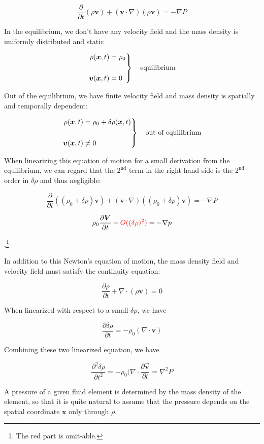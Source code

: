 ﻿\documentclass[twoside]{book}
\numberwithin{equation}{section}
\begin{document}
\[\frac{\partial}{\partial t}(\rho\bm{v})+(\bm{v}\cdot\nabla)(\rho\bm{v}) = -\nabla P \]

In the equilibrium, we don't have any velocity field and the mass density is uniformly distributed and static

\[\left.\begin{split}
\rho(\bm{x},t) &= \rho_0\\
\ & \ \\
\bm{v}(\bm{x},t) &= 0
\end{split}\right\}\text{\quad equilibrium} \]

Out of the equilibrium, we have finite velocity field and mass density is spatially and temporally dependent:

\[\left.\begin{split}
\rho(\bm{x},t) &= \rho_0 + \delta\rho(\bm{x},t)\\
\ & \ \\
\bm{v}(\bm{x},t) &\neq 0
\end{split}\right\}\text{\quad out of equilibrium} \]

When linearizing this equation of motion for a small derivation from the equilibrium, we can regard that the $2^{\text{nd}}$ term in the right hand side is the $2^{\text{nd}}$ order in $\delta\rho$ and thus negligible:

\[\frac{\partial}{\partial t}\left((\rho_0+\delta\rho)\bm{v}\right) + (\bm{v}\cdot\nabla)\left((\rho_0+\delta\rho)\bm{v}\right) = -\nabla P \]

\[\rho_0\frac{\partial\bm{V}}{\partial t} + {\color{red}{O((\delta\rho)^2)}}= -\nabla p \]

,\footnote{The red part is omit-able. }

In addition to this Newton's equation of motion, the mass density field and velocity field must satisfy the continuity equation: 

\[\frac{\partial \rho}{\partial t}+\nabla\cdot(\rho\bm{v}) = 0 \]

When linearized with respect to a small $\delta \rho$, we have

\[\frac{\partial\delta\rho}{\partial t} = -\rho_0(\nabla\cdot\bm{v}) \]

Combining these two linearized equation, we have

\[\frac{\partial^2\delta\rho}{\partial t^2}= -\rho_0(\nabla\cdot\frac{\partial\vec{\bm{v}}}{\partial t} = \nabla^2 P \]

A pressure of a given fluid element is determined by the mass density of the element, so that it is quite natural to assume that the pressure depends on the spatial coordinate $\bm{x}$ only through $\rho$. 
\end{document}
